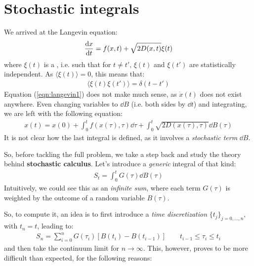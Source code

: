 \documentclass[../template.tex]{subfiles}
\begin{document}
\section{Stochastic integrals}
We arrived at the Langevin equation:
\begin{align}
    \dv{x}{t} = f(x,t) + \sqrt{2D(x,t)} \xi(t)
    \label{eqn:langevin1}
\end{align}
where $\xi(t)$ is a , i.e. such that for $t\neq t'$, $\xi(t)$ and $\xi(t')$ are statistically independent. As $\langle \xi(t) \rangle = 0$, this means that:
\begin{align*}
    \langle \xi(t) \xi(t') \rangle = \delta(t - t')
\end{align*}  
Equation (\ref{eqn:langevin1}) does not make much sense, as $\dot{x}(t)$ does not exist anywhere. Even changing variables to $\dd{B}$ (i.e.  both sides by $\dd{t}$) and integrating, we are left with the following equation: 
\begin{align*}
    x(t) = x(0) + \int_0^t f(x(\tau), \tau) \dd{\tau} + \int_0^t \sqrt{2D(x(\tau), \tau)} \dd{B(\tau)} 
\end{align*}
It is not clear how the last integral is defined, as it involves a \textit{stochastic term} $\dd{B}$.

\medskip

So, before tackling the full problem, we take a step back and study the theory behind \textbf{stochastic calculus}. Let's introduce a \textit{generic} integral of that kind:
\begin{align*}
    S_t = \int_0^t G(\tau) \dd{B(\tau)}
\end{align*} 
Intuitively, we could see this as an \textit{infinite sum}, where each term $G(\tau)$ is weighted by the outcome of a random variable $B(\tau)$.

So, to compute it, an idea is to first introduce a \textit{time discretization} $\{t_j\}_{j=0, \dots, n}$, with $t_n = t$, leading to:  
\begin{align}
    S_n = \sum_{i=0}^{n} G(\tau_i) [B(t_i) - B(t_{i-1})] \qquad t_{i-1} \leq \tau_i \leq t_i
    \label{eqn:discretization1}
\end{align}
and then take the continuum limit for $n \to \infty$. This, however, proves to be more difficult than expected, for the following reasons:
\end{document}
